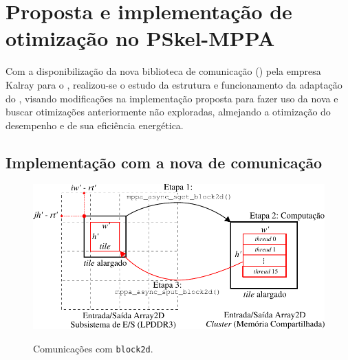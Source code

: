 %

\chapter{Proposta e implementação de otimização no PSkel-MPPA}
\label{cap:pskelMPPA}

Com a disponibilização da nova biblioteca de comunicação (\async) pela empresa Kalray para o \mppa, realizou-se o estudo da estrutura e funcionamento da adaptação do \pskelmppa, visando modificações na implementação proposta para fazer uso da nova \api e buscar otimizações anteriormente não exploradas, almejando a otimização do desempenho e de sua eficiência energética.

\section{Implementação com a nova \api de comunicação \async}
\label{sec:implementacao-async}

\begin{figure}
	\centering
	\caption{Comunicações com \texttt{block2d}.}
	\includegraphics[width=1\textwidth]{figs/pskel-mppa-fluxogram.pdf} \\
    \label{fig:block2d}
\end{figure}

